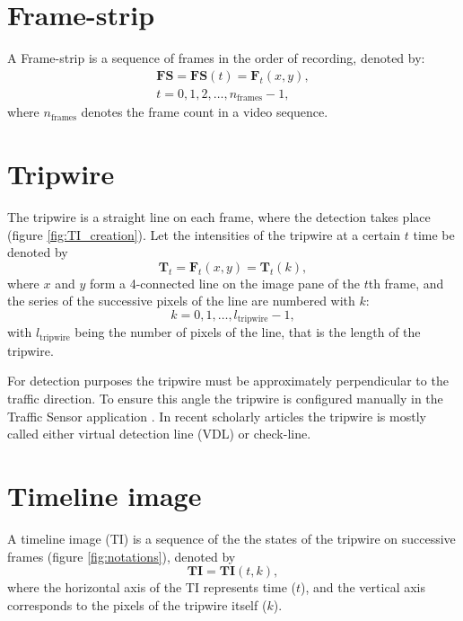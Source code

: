 \section{Frame-strip}
A Frame-strip is a sequence of frames in the order of recording, denoted by:
\begin{gather*}
	\boldsymbol{FS}=\boldsymbol{FS}(t)=\boldsymbol{F}_t(x,y), \\
	t=0,1,2,\dotsc,n_{\text{frames}}-1,
\end{gather*}
where $n_{\text{frames}}$ denotes the frame count in a video sequence.
\section{Tripwire}
The tripwire is a straight line on each frame, where the detection takes place (figure \ref{fig:TI_creation}).
Let the intensities of the tripwire at a certain $t$ time be denoted by 
\begin{displaymath}
\boldsymbol{T}_t=\boldsymbol{F}_t(x,y)=\boldsymbol{T}_t(k),
\end{displaymath}
where $x$ and $y$ form a 4-connected line on the image pane of the $t$th frame, and the series of the successive pixels of the line are numbered with $k$:
\begin{displaymath}
	k=0,1,\dotsc,l_{\text{tripwire}}-1,
\end{displaymath}
with $l_{\text{tripwire}}$ being the number of pixels of the line, that is the length of the tripwire.

For detection purposes the tripwire must be approximately perpendicular to the traffic direction.
To ensure this angle the tripwire is configured manually in the Traffic Sensor application .
In recent scholarly articles the tripwire is mostly called either virtual detection line (VDL) or check-line.
\section{Timeline image}
A timeline image (TI) is a sequence of the the states of the tripwire on successive frames (figure \ref{fig:notations}), denoted by
\begin{displaymath}
	\boldsymbol{TI}=\boldsymbol{TI}(t,k),
\end{displaymath}
where the horizontal axis of the TI represents time ($t$), and the vertical axis corresponds to the pixels of the tripwire itself ($k$).
 
